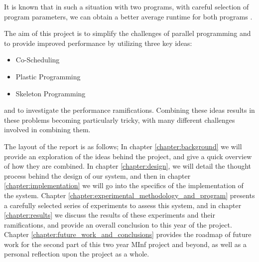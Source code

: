 It is known that in such a situation with two programs, with careful selection of program parameters, we can obtain a better average runtime for both programs \cite{lira}.

The aim of this project is to simplify the challenges of parallel programming and to provide improved performance by utilizing three key ideas:

\begin{itemize}
	\item Co-Scheduling
	\item Plastic Programming
	\item Skeleton Programming
\end{itemize}

and to investigate the performance ramifications. Combining these ideas results in these problems becoming particularly tricky, with many different challenges involved in combining them.

The layout of the report is as follows; In chapter \ref{chapter:background} we will provide an exploration of the ideas behind the project, and give a quick overview of how they are combined. In chapter \ref{chapter:design}, we will detail the thought process behind the design of our system, and then in chapter \ref{chapter:implementation} we will go into the specifics of the implementation of the system. Chapter \ref{chapter:experimental_methodology_and_program} presents a carefully selected series of experiments to assess this system, and in chapter \ref{chapter:results} we discuss the results of these experiments and their ramifications, and provide an overall conclusion to this year of the project. Chapter \ref{chapter:future_work_and_conclusions} provides the roadmap of future work for the second part of this two year MInf project and beyond, as well as a personal reflection upon the project as a whole.